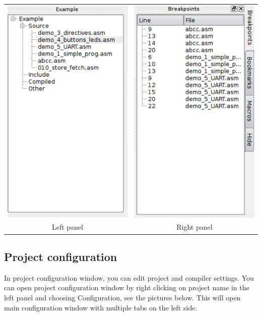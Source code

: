     \begin{table}[h!]
        \begin{tabular}{cc}
            \includegraphics[width=.33\textwidth]{img/left_panel.png}
                &
            \includegraphics[width=.33\textwidth]{img/right_panel.png}
                \\
            Left panel & Right panel
        \end{tabular}
    \end{table}

\clearpage

\subsection{Project configuration}
    In project configuration window, you can edit project and compiler settings. You can open project configuration
    window by right clicking on project name in the left panel and choosing Configuration, see the pictures below.
    This will open main configuration window with multiple tabs on the left side.

